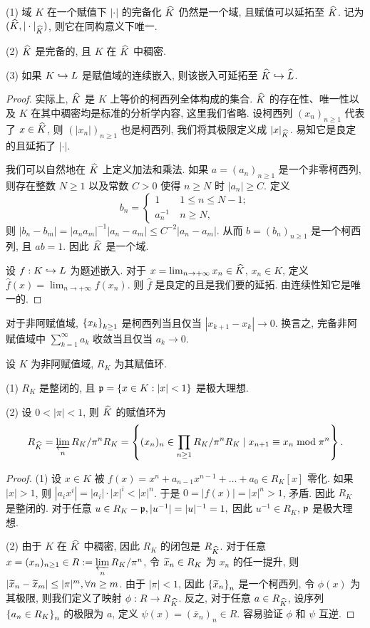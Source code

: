 \begin{proposition}{}{}
(1) 域 $K$ 在一个赋值下 $|\cdot|$ 的完备化 $\widehat K$ 仍然是一个域, 且赋值可以延拓至 $\widehat K$. 记为 $(\widehat K,|\cdot|_{\widehat K})$, 则它在同构意义下唯一.

(2) $\widehat K$ 是完备的, 且 $K$ 在 $\widehat K$ 中稠密.

(3) 如果 $K\hookrightarrow L$ 是赋值域的连续嵌入, 则该嵌入可延拓至 $\widehat K\hookrightarrow \widehat L$.
\end{proposition}
\begin{proof}
实际上, $\widehat K$ 是 $K$ 上等价的柯西列全体构成的集合.
$\widehat K$ 的存在性、唯一性以及 $K$ 在其中稠密均是标准的分析学内容, 这里我们省略. 设柯西列 $(x_n)_{n\ge 1}$ 代表了 $x\in\widehat K$, 则 $(|x_n|)_{n\ge 1}$ 也是柯西列, 我们将其极限定义成 $|x|_{\widehat K}$. 易知它是良定的且延拓了 $|\cdot|$.

我们可以自然地在 $\widehat K$ 上定义加法和乘法. 如果 $a=(a_n)_{n\ge 1}$ 是一个非零柯西列, 则存在整数 $N\ge 1$ 以及常数 $C>0$ 使得 $n\ge N$ 时 $|a_n|\ge C$. 定义
	\[b_n=\begin{cases}
		1& 1\le n\le N-1;\\
		a_n^{-1}\ & n\ge N,\end{cases}\]
则 $|b_n-b_m|=|a_na_m|^{-1}|a_n-a_m|\le C^{-2}|a_n-a_m|$.
从而 $b=(b_n)_{n\ge 1}$ 是一个柯西列, 且 $ab=1$. 因此 $\widehat K$ 是一个域.

设 $f:K\hookrightarrow L$ 为题述嵌入. 
对于 $x=\lim_{n\to +\infty} x_n\in\widehat K$, $x_n\in K$, 定义 $\hat f(x)=\lim_{n\to +\infty}f(x_n)$. 则 $\hat f$ 是良定的且是我们要的延拓. 由连续性知它是唯一的.
\end{proof}

\begin{exercise}
对于非阿赋值域, $\left\{x_k\right\}_{k\ge 1}$ 是柯西列当且仅当 $|x_{k+1}-x_k|\to 0$. 换言之, 完备非阿赋值域中 $\sum_{k=1}^\infty a_k$ 收敛当且仅当 $a_k\to 0$.
\end{exercise}

\begin{proposition}{}{}
设 $K$ 为非阿赋值域, $R_K$ 为其赋值环.

(1) $R_K$ 是整闭的, 且 ${\mathfrak{p}}=\left\{x\in K: |x|<1\right\}$ 是极大理想.

(2) 设 $0<|\pi|<1$, 则 $\widehat K$ 的赋值环为
  \[R_{\widehat K}=\varprojlim\limits_n R_K/\pi^n R_K=\left\{(x_n)_n\in\prod_{n\ge 1}R_K/\pi^nR_K\mid x_{n+1}\equiv x_n\bmod{\pi^n}\right\}.\]
\end{proposition}
\begin{proof}
(1) 设 $x\in K$ 被 $f(x)=x^n+a_{n-1}x^{n-1}+\dots+a_0\in R_K[x]$ 零化. 如果 $|x|>1$, 则 $|a_i x^i|=|a_i|\cdot|x|^i<|x|^n$. 于是 $0=|f(x)|=|x|^n>1$, 矛盾. 因此 $R_K$ 是整闭的. 对于任意 $u\in R_K-{\mathfrak{p}}, |u^{-1}|=|u|^{-1}=1,$ 因此 $u^{-1}\in R_K$, ${\mathfrak{p}}$ 是极大理想.

(2) 由于 $K$ 在 $\widehat K$ 中稠密, 因此 $R_K$ 的闭包是 $R_{\widehat K}$. 对于任意 $x=(x_n)_{n\ge 1}\in R:=\varprojlim\limits_n R_K/\pi^n$, 令 $\widetilde x_n\in R_K$ 为 $x_n$ 的任一提升, 则 $|\widetilde x_n-\widetilde x_m|\le |\pi|^m,\forall n\ge m$. 由于 $|\pi|<1$, 因此 $\left\{\widetilde x_n\right\}_n$ 是一个柯西列, 令 $\phi(x)$ 为其极限, 则我们定义了映射 $\phi:R\to R_{\widehat K}$. 反之, 对于任意 $a\in R_{\widehat K}$, 设序列 $\left\{a_n\in R_K\right\}_n$ 的极限为 $a$, 定义 $\psi(x)=(\bar x_n)_n\in R$. 容易验证 $\phi$ 和 $\psi$ 互逆.
\end{proof}

